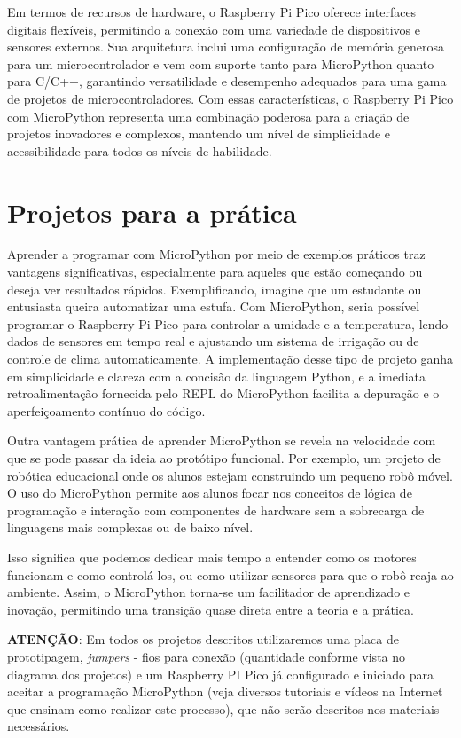 \documentclass[a4paper,11pt]{article}
\begin{document}
Em termos de recursos de hardware, o Raspberry Pi Pico oferece interfaces digitais flexíveis, permitindo a conexão com uma variedade de dispositivos e sensores externos. Sua arquitetura inclui uma configuração de memória generosa para um microcontrolador e vem com suporte tanto para MicroPython quanto para C/C++, garantindo versatilidade e desempenho adequados para uma gama de projetos de microcontroladores. Com essas características, o Raspberry Pi Pico com MicroPython representa uma combinação poderosa para a criação de projetos inovadores e complexos, mantendo um nível de simplicidade e acessibilidade para todos os níveis de habilidade.

\section{Projetos para a prática}
Aprender a programar com MicroPython por meio de exemplos práticos traz vantagens significativas, especialmente para aqueles que estão começando ou deseja ver resultados rápidos. Exemplificando, imagine que um estudante ou entusiasta queira automatizar uma estufa. Com MicroPython, seria possível programar o Raspberry Pi Pico para controlar a umidade e a temperatura, lendo dados de sensores em tempo real e ajustando um sistema de irrigação ou de controle de clima automaticamente. A implementação desse tipo de projeto ganha em simplicidade e clareza com a concisão da linguagem Python, e a imediata retroalimentação fornecida pelo REPL do MicroPython facilita a depuração e o aperfeiçoamento contínuo do código.

Outra vantagem prática de aprender MicroPython se revela na velocidade com que se pode passar da ideia ao protótipo funcional. Por exemplo, um projeto de robótica educacional onde os alunos estejam construindo um pequeno robô móvel. O uso do MicroPython permite aos alunos focar nos conceitos de lógica de programação e interação com componentes de hardware sem a sobrecarga de linguagens mais complexas ou de baixo nível. 

Isso significa que podemos dedicar mais tempo a entender como os motores funcionam e como controlá-los, ou como utilizar sensores para que o robô reaja ao ambiente. Assim, o MicroPython torna-se um facilitador de aprendizado e inovação, permitindo uma transição quase direta entre a teoria e a prática.

\textbf{ATENÇÃO}: Em todos os projetos descritos utilizaremos uma placa de prototipagem, \textit{jumpers} - fios para conexão (quantidade conforme vista no diagrama dos projetos) e um Raspberry PI Pico já configurado e iniciado para aceitar a programação MicroPython (veja diversos tutoriais e vídeos na Internet que ensinam como realizar este processo), que não serão descritos nos materiais necessários.
\end{document}
